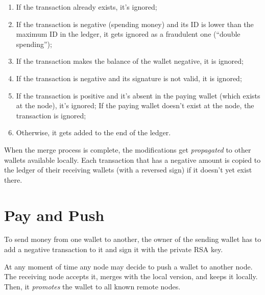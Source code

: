 \documentclass[11pt,oneside]{article}
\begin{document}
\begin{enumerate}
\item If the transaction already exists, it's ignored;
\item If the transaction is negative (spending money) and its ID is lower than
the maximum ID in the ledger, it gets ignored as a fraudulent one (``double spending'');
\item If the transaction makes the balance of the wallet negative, it is ignored;
\item If the transaction is negative and its signature is not valid, it is ignored;
\item If the transaction is positive and it's absent in the paying wallet
(which exists at the node), it's ignored; If the paying wallet doesn't exist at the node,
the transaction is ignored;
\item Otherwise, it gets added to the end of the ledger.
\end{enumerate}

When the merge process is complete, the modifications get \emph{propagated} to other wallets
available locally. Each transaction that has a negative amount is
copied to the ledger of their receiving wallets (with a reversed sign)
if it doesn't yet exist there.

\section{Pay and Push}

To send money from one wallet to another, the owner of the sending wallet
has to add a negative transaction to it and sign it with the private RSA key.

At any moment of time any node may decide to push a wallet to another node.
The receiving node accepts it, merges with the local version, and keeps it locally.
Then, it \emph{promotes} the wallet to all known remote nodes.

\end{document}
